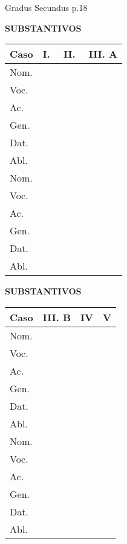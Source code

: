 \documentclass[12pt, oneside, a4paper, article]{article}
\begin{document}
\clearpage
Gradus Secundus p.18

\begin{table}[!hb]
\centering
\textbf{SUBSTANTIVOS} 
\vspace{1 ex}

\begin{tabular}{|l|p{2cm}|p{2cm}|p{2cm}|p{2cm}|p{2cm}|p{2cm}|p{2cm}|} %
\hline \hline
Caso & \multicolumn{1}{c|}{I.} & \multicolumn{3}{c|}{II.} & \multicolumn{3}{c|}{III. A} \\
\hline
Nom. &  &  &  &  &  &  &   \\ \hline
Voc. &  &  &  &  &  &  &   \\ \hline
Ac.  &  &  &  &  &  &  &   \\ \hline
Gen. &  &  &  &  &  &  &   \\ \hline
Dat. &  &  &  &  &  &  &   \\ \hline
Abl. &  &  &  &  &  &  &   \\ 
\hline \hline
Nom. &  &  &  &  &  &  &   \\ \hline
Voc. &  &  &  &  &  &  &   \\ \hline
Ac.  &  &  &  &  &  &  &   \\ \hline
Gen. &  &  &  &  &  &  &   \\ \hline
Dat. &  &  &  &  &  &  &   \\ \hline
Abl. &  &  &  &  &  &  &   \\ 
\hline \hline
\end{tabular}
\end{table}


\begin{table}[!h]
\centering
\textbf{SUBSTANTIVOS} 
\vspace{1 ex}

\begin{tabular}{|l|p{2cm}|p{2cm}|p{2cm}|p{2cm}|p{2cm}|p{2cm}|} %
\hline \hline
Caso & \multicolumn{3}{c|}{III. B} & \multicolumn{2}{c|}{IV} & \multicolumn{1}{c|}{V} \\
\hline
Nom. &  &  &  &  &  &   \\ \hline
Voc. &  &  &  &  &  &   \\ \hline
Ac.  &  &  &  &  &  &   \\ \hline
Gen. &  &  &  &  &  &   \\ \hline
Dat. &  &  &  &  &  &   \\ \hline
Abl. &  &  &  &  &  &   \\
\hline \hline
Nom. &  &  &  &  &  &   \\ \hline
Voc. &  &  &  &  &  &   \\ \hline
Ac.  &  &  &  &  &  &   \\ \hline
Gen. &  &  &  &  &  &   \\ \hline
Dat. &  &  &  &  &  &   \\ \hline
Abl. &  &  &  &  &  &   \\ 
\hline \hline
\end{tabular}
\end{table}
\end{document}
